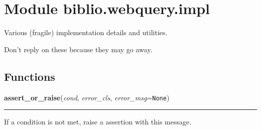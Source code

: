 %
%
%


\section{Module biblio.webquery.impl}

    \label{biblio:webquery:impl}

Various (fragile) implementation details and utilities.

Don't reply on these because they may go away.


  \subsection{Functions}

    \label{biblio:webquery:impl:assert_or_raise}

    \vspace{0.5ex}

\hspace{.8\funcindent}\begin{boxedminipage}{\funcwidth}

    \raggedright \textbf{assert\_or\_raise}(\textit{cond}, \textit{error\_cls}, \textit{error\_msg}={\tt None})

    \vspace{-1.5ex}

    \rule{\textwidth}{0.5\fboxrule}
\setlength{\parskip}{2ex}

If a condition is not met, raise a assertion with this message.
\setlength{\parskip}{1ex}
    \end{boxedminipage}


